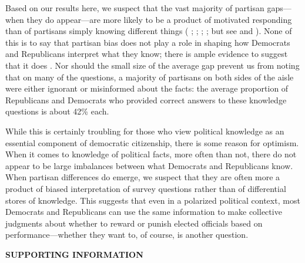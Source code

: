\documentclass[12pt, letterpaper]{article}
\begin{document}
Based on our results here, we suspect that the vast majority of partisan gaps---when they do appear---are more likely to be a product of motivated responding than of partisans simply knowing different things (\citeauthor{bisgaard_slothuus_2018} \citeyear{bisgaard_slothuus_2018}; \citeauthor {bullocketal_2015} \citeyear{bullocketal_2015}; \citeauthor{prior2015you} \citeyear{prior2015you}; \citeauthor{schaffner_luks} \citeyear{schaffner_luks}; but see \citeauthor{berinsky_2017} \citeyear{berinsky_2017} and \citeauthor{peterson_iyengar_forth} \citeyear{peterson_iyengar_forth}). None of this is to say that partisan bias does not play a role in shaping how Democrats and Republicans interpret what they know; there is ample evidence to suggest that it does \citep[e.g.,][]{bisgaard2015bias, gainesetal_2007, khanna2018motivated}. Nor should the small size of the average gap prevent us from noting that on many of the questions, a majority of partisans on both sides of the aisle were either ignorant or misinformed about the facts: the average proportion of Republicans and Democrats who provided correct answers to these knowledge questions is about 42\% each. 

While this is certainly troubling for those who view political knowledge as an essential component of democratic citizenship, there is some reason for optimism. When it comes to knowledge of political facts, more often than not, there do not appear to be large imbalances between what Democrats and Republicans know. When partisan differences do emerge, we suspect that they are often more a product of biased interpretation of survey questions rather than of differential stores of knowledge. This suggests that even in a polarized political context, most Democrats and Republicans can use the same information to make collective judgments about whether to reward or punish elected officials based on performance---whether they want to, of course, is another question. 

\clearpage



\clearpage

\appendix
\renewcommand{\thesection}{SI \arabic{section}}
\setcounter{table}{0}\renewcommand\thetable{\thesection.\arabic{table}}  
\setcounter{figure}{0}\renewcommand\thefigure{\thesection.\arabic{figure}}


\begin{center}
\Large \textbf{SUPPORTING INFORMATION}
\end{center}
\singlespacing
\vspace{-.4in}
\end{document}
